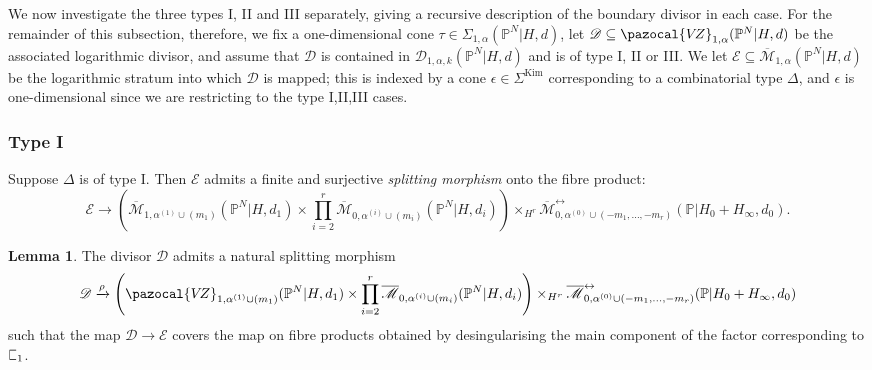 \documentclass[11pt]{amsart}
\newcommand{\sqC}{\scalebox{0.8}[1.3]{$\sqsubset$}}
\newcommand{\Kim}{\operatorname{Kim}}
\newcommand{\PP}{\mathbb P}
\newcommand{\VZ}{\pazocal{V\!Z}}
\renewcommand{\to}{\rightarrow}
\newcommand{\Mcal}{\mathcal{M}}
\newcommand{\Dcal}{\mathcal{D}}
\newcommand{\Ecal}{\mathcal{E}}
\newcommand{\ol}[1]{\overline{#1}}
\theoremstyle{definition}
\newtheorem{lemma}[thm]{Lemma}
\theoremstyle{definition}
\begin{document}
We now investigate the three types I, II and III separately, giving a recursive description of the boundary divisor in each case. For the remainder of this subsection, therefore, we fix a one-dimensional cone $\tau \in \Sigma_{1,\alpha}(\PP^N|H,d)$, let $\Dcal \subseteq \VZ_{1,\alpha}(\PP^N|H,d)$ be the associated logarithmic divisor, and assume that $\Dcal$ is contained in $\Dcal_{1,\alpha,k}(\PP^N|H,d)$ and is of type I, II or III. We let $\Ecal \subseteq \ol\Mcal_{1,\alpha}(\PP^N|H,d)$ be the logarithmic stratum into which $\Dcal$ is mapped; this is indexed by a cone $\epsilon \in \Sigma^{\Kim}$ corresponding to a combinatorial type $\Delta$, and $\epsilon$ is one-dimensional since we are restricting to the type I,II,III cases.


\subsubsection{Type I}\label{subsubsection type A} Suppose $\Delta$ is of type I. Then $\Ecal$ admits a finite and surjective \textit{splitting morphism} onto the fibre product:
\begin{equation*} \Ecal \to \left( \ol\Mcal_{1,\alpha^{(1)}\cup(m_1)}(\PP^N|H,d_1) \times \prod_{i=2}^r \ol\Mcal_{0,\alpha^{(i)}\cup(m_i)}(\PP^N|H,d_i) \right) \times_{H^r} \ol\Mcal^{\leftrightarrow}_{0,\alpha^{(0)}\cup (-m_1,\ldots,-m_r)}(\mathbb{P}|H_0+H_\infty,d_0).\end{equation*}

\begin{lemma} \label{Lemma type A gluing} The divisor $\Dcal$ admits a natural splitting morphism
\begin{equation*}\Dcal \xrightarrow{\rho} \left(\VZ_{1,\alpha^{(1)}\cup(m_1)}(\PP^N|H,d_1)\times\prod_{i=2}^r \ol\Mcal_{0,\alpha^{(i)}\cup(m_i)}(\PP^N|H,d_i)\right) \times_{H^r} \ol\Mcal^{\leftrightarrow}_{0,\alpha^{(0)}\cup (-m_1,\ldots,-m_r)}(\mathbb{P}|H_0+H_\infty,d_0)\end{equation*}
such that the map $\Dcal \to \Ecal$ covers the map on fibre products obtained by desingularising the main component of the factor corresponding to $\sqC_1$.\end{lemma}
\end{document}
